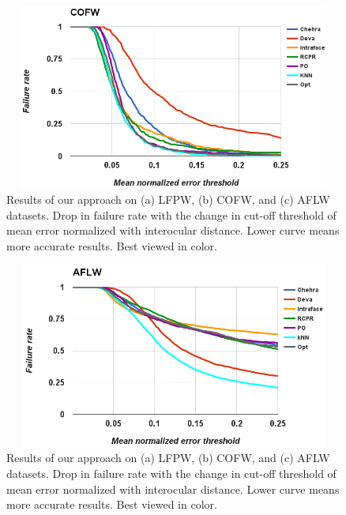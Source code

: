 \begin{figure}[!ht]
  \centering
  \includegraphics[width=4.8in,height=2.4in]{fid/figures/cofw_failure_rate_graph.png}
  \caption{Results of our approach on (a) LFPW, (b) COFW, and (c) AFLW datasets.
  Drop in failure rate with the change in cut-off threshold of mean error normalized 
  with interocular distance. Lower curve means more accurate results. Best viewed in color.}
  \label{fig:graph_results}
\end{figure}

\begin{figure}[!ht]
  \centering
  \includegraphics[width=4.8in,height=2.4in]{fid/figures/aflw_failure_rate_graph.png}
  \caption{Results of our approach on (a) LFPW, (b) COFW, and (c) AFLW datasets.
  Drop in failure rate with the change in cut-off threshold of mean error normalized 
  with interocular distance. Lower curve means more accurate results. Best viewed in color.}
  \label{fig:graph_results}
\end{figure}

